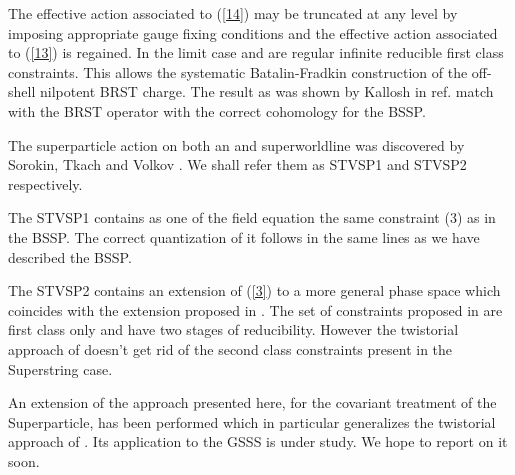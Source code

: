 \documentclass[a4paper,10pt]{article}
\begin{document}
The effective action associated to (\ref{14}) may be truncated at any
level \myHighlight{$\ell$}\coordHE{} by imposing appropriate gauge fixing conditions and
the effective action associated to (\ref{13}) is regained. In the limit
case \myHighlight{$\np$}\coordHE{}  \coordHE{} and \coordHE{}  \coordHE{} are
regular infinite reducible first class constraints. This  allows
the systematic Batalin-Fradkin construction of the off-shell
nilpotent BRST charge. The result as was shown by Kallosh in ref.
\cite{[10]} match with the BRST operator with the correct cohomology for
the BSSP.

The superparticle action on both an \coordHE{} and \coordHE{} superworldline was
discovered by Sorokin, Tkach and Volkov \cite{[13]}. We shall refer them as STVSP1 and
STVSP2 respectively.

The STVSP1 contains as one of the field equation the same constraint (3) as in
the BSSP. The correct quantization of it follows in the same lines as we have
described the BSSP.

The STVSP2 contains an extension of (\ref{3}) to a more general phase
space which coincides with the extension proposed in \cite{[14]}. The set
of constraints proposed in \cite{[14]} are first class only and have two
stages of reducibility. However the twistorial approach of \cite{[14]}
doesn't get rid of the second class constraints present in the
Superstring case.

An extension of the approach presented here, for the covariant treatment of
the Superparticle, has been performed which in particular generalizes the
twistorial approach of \cite{[14]}. Its application to the GSSS is under study. We
hope to report on it soon.
\end{document}
